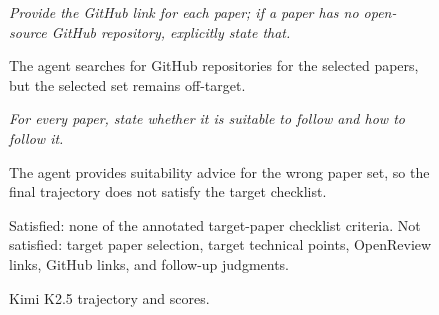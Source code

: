 \begin{figure}[h]
{    \vspace{2pt}
    \emph{Provide the GitHub link for each paper; if a paper has no open-source GitHub repository, explicitly state that.}

    The agent searches for GitHub repositories for the selected papers, but the selected set remains off-target.

    \vspace{2pt}
    \emph{For every paper, state whether it is suitable to follow and how to follow it.}

    The agent provides suitability advice for the wrong paper set, so the final trajectory does not satisfy the target checklist.

    \vspace{3pt}
    \hspace{3pt}

    \vspace{2pt}
    \noindent{}
    Satisfied: none of the annotated target-paper checklist criteria.
    Not satisfied: target paper selection, target technical points, OpenReview links, GitHub links, and follow-up judgments.
    }
    \caption{Kimi K2.5 trajectory and scores.}
    \label{fig:case_leihaodi_2_kimi_trajectory}
\end{figure}
